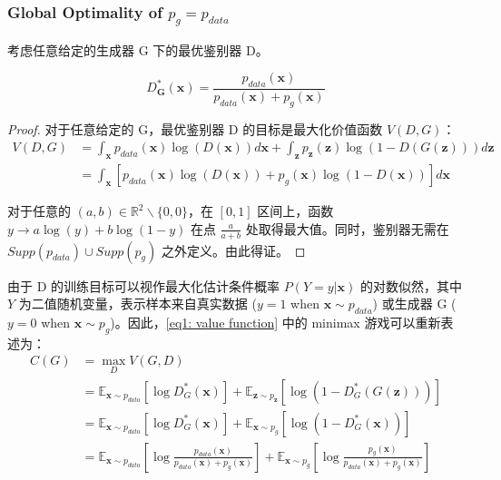 \documentclass{myarticle}
\begin{document}
    \subsubsection{Global Optimality of \texorpdfstring{$p_g=p_{data}$}{Lg}}

    考虑任意给定的生成器 G 下的最优鉴别器 D。
    \begin{proposition}
        \begin{equation}
            D_{\bm{G}}^{*}(\bm{x})=\frac{p_{data}(\bm{x})}{p_{data}(\bm{x})+p_g(\bm{x})} \label{eq2: optimal discriminator}
        \end{equation}
    \end{proposition}

    \begin{proof}
        对于任意给定的 G，最优鉴别器 D 的目标是最大化价值函数 $V(D,G)$：
        \begin{equation}
            \begin{aligned}
                V(D,G)&=\int_{\bm{x}} p_{data}(\bm{x})\log(D(\bm{x}))d\bm{x}+\int_{\bm{z}} p_{\bm{z}}(\bm{z})\log(1-D(G(\bm{z})))d\bm{z} \\
                &=\int_{\bm{x}}[p_{data}(\bm{x})\log(D(\bm{x}))+p_g(\bm{x})\log(1-D(\bm{x}))]d\bm{x}
            \end{aligned}
        \end{equation}

        对于任意的 $(a,b)\in \mathbb{R}^2 \backslash \{0,0\}$，在 $[0,1]$ 区间上，函数 $y\rightarrow a\log(y)+b\log(1-y)$ 在点 $\frac{a}{a+b}$ 处取得最大值。同时，鉴别器无需在 $Supp(p_{data})\cup Supp(p_{g})$ 之外定义。由此得证。
        
        \QED
    \end{proof}

    由于 D 的训练目标可以视作最大化估计条件概率 $P(Y=y|\bm{x})$ 的对数似然，其中 $Y$ 为二值随机变量，表示样本来自真实数据 ($y=1$ when $\bm{x}\sim p_{data}$) 或生成器 G ($y=0$ when $\bm{x}\sim p_{g}$)。因此，\eqref{eq1: value function} 中的 minimax 游戏可以重新表述为：
    \begin{equation}
        \begin{split}
            C(G)&=\max_{D}V(G,D) \\
            &=\mathbb{E}_{\bm{x}\sim p_{data}}[\log D_{G}^{*}(\bm{x})]+\mathbb{E}_{\bm{z}\sim p_{\bm{z}}}[\log(1-D_{G}^{*}(G(\bm{z})))] \\
            &=\mathbb{E}_{\bm{x}\sim p_{data}}[\log D_{G}^{*}(\bm{x})]+\mathbb{E}_{\bm{x}\sim p_{g}}[\log(1-D_{G}^{*}(\bm{x}))] \\
            &=\mathbb{E}_{\bm{x}\sim p_{data}}[\log \frac{p_{data}(\bm{x})}{p_{data}(\bm{x})+p_g(\bm{x})}]+\mathbb{E}_{\bm{x}\sim p_{g}}[\log \frac{p_g(\bm{x})}{p_{data}(\bm{x})+p_g(\bm{x})}] \label{eq3: reformulated training criterion}
        \end{split}
    \end{equation}
\end{document}
